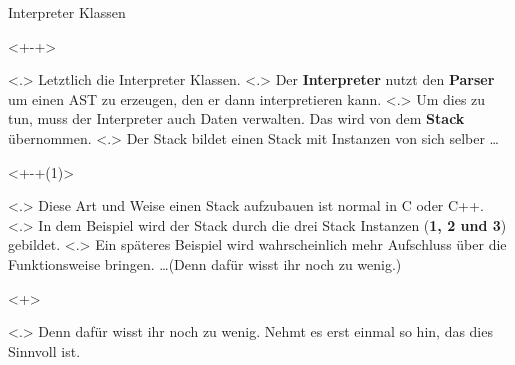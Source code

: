   \begin{frame}{Interpreter Klassen}
    \begin{uncoverenv}<+-+>%
          \note[item]<.>{
            Letztlich die Interpreter Klassen.
          }
          \note[item]<.>{
            Der \textbf{Interpreter} nutzt den \textbf{Parser} um einen AST zu erzeugen, den er dann interpretieren kann.
          }
          \note[item]<.>{
            Um dies zu tun, muss der Interpreter auch Daten verwalten. Das wird von dem \textbf{Stack} übernommen.
          }
          \note[item]<.>{
            Der Stack bildet einen Stack mit Instanzen von sich selber \ldots
          }
    \end{uncoverenv}
    \begin{uncoverenv}<+-+(1)>%
          \note[item]<.>{
            Diese Art und Weise einen Stack aufzubauen ist normal in C oder C++.
          }
          \note[item]<.>{
            In dem Beispiel wird der Stack durch die drei Stack Instanzen (\textbf{1, 2 und 3}) gebildet.
          }
          \note[item]<.>{
            Ein späteres Beispiel wird wahrscheinlich mehr Aufschluss über die Funktionsweise bringen. \ldots (Denn dafür wisst ihr noch zu wenig.)
          }

      \begin{uncoverenv}<+>%
      \end{uncoverenv}%
          \note[item]<.>{
            Denn dafür wisst ihr noch zu wenig. Nehmt es erst einmal so hin, das dies Sinnvoll ist.
          }
    \end{uncoverenv}


\end{frame}
